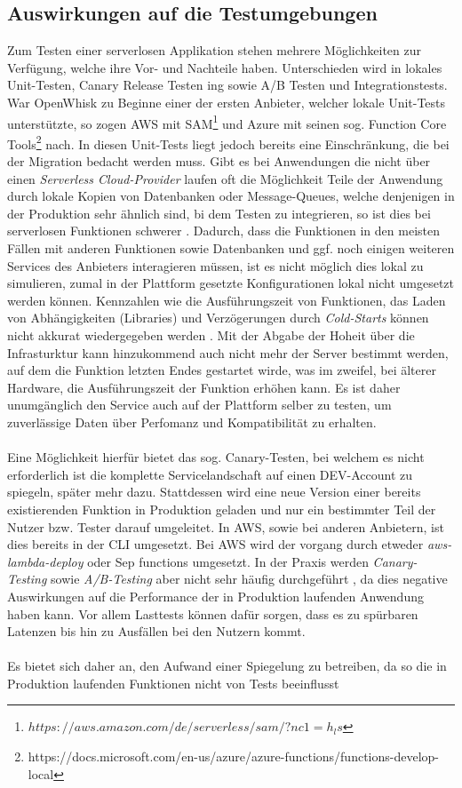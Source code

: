 \subsection{Auswirkungen auf die Testumgebungen}
Zum Testen einer serverlosen Applikation stehen mehrere Möglichkeiten zur Verfügung, welche ihre Vor- und Nachteile haben. Unterschieden wird in lokales Unit-Testen, Canary Release Testen ing sowie A/B Testen und Integrationstests. War OpenWhisk zu Beginne einer der ersten Anbieter, welcher lokale Unit-Tests unterstützte, so zogen AWS mit SAM\footnote{$https://aws.amazon.com/de/serverless/sam/?nc1=h_ls$} und Azure mit seinen sog. Function Core Tools\footnote{https://docs.microsoft.com/en-us/azure/azure-functions/functions-develop-local} nach. In diesen Unit-Tests liegt jedoch bereits eine Einschränkung, die bei der Migration bedacht werden muss. Gibt es bei Anwendungen die nicht über einen \textit{Serverless Cloud-Provider} laufen oft die Möglichkeit Teile der Anwendung durch lokale Kopien von Datenbanken oder Message-Queues, welche denjenigen in der Produktion sehr ähnlich sind, bi dem Testen zu integrieren, so ist dies bei serverlosen Funktionen schwerer \cite{roberts2017serverless}.  Dadurch, dass die Funktionen in den meisten Fällen mit anderen Funktionen sowie Datenbanken und ggf. noch einigen weiteren Services des Anbieters interagieren müssen, ist es nicht möglich dies lokal zu simulieren, zumal in der Plattform gesetzte Konfigurationen lokal nicht umgesetzt werden können. Kennzahlen wie die Ausführungszeit von Funktionen, das Laden von Abhängigkeiten (Libraries) und Verzögerungen durch \textit{Cold-Starts} können nicht akkurat wiedergegeben werden \cite{racicot2019quality}. Mit der Abgabe der Hoheit über die Infrasturktur kann hinzukommend auch nicht mehr der Server bestimmt werden, auf dem die Funktion letzten Endes gestartet wirde, was im zweifel, bei älterer Hardware, die Ausführungszeit der Funktion erhöhen kann. Es ist daher unumgänglich den Service auch auf der Plattform selber zu testen, um zuverlässige Daten über Perfomanz und Kompatibilität zu erhalten.\\\\ Eine Möglichkeit hierfür bietet das sog. Canary-Testen, bei welchem es nicht erforderlich ist die komplette Servicelandschaft auf einen DEV-Account zu spiegeln, später mehr dazu. Stattdessen wird eine neue Version einer bereits existierenden Funktion in Produktion geladen und nur ein bestimmter Teil der Nutzer bzw. Tester darauf umgeleitet. In AWS, sowie bei anderen Anbietern, ist dies bereits in der CLI umgesetzt. Bei AWS wird der vorgang durch etweder \textit{aws-lambda-deploy} oder Sep functions umgesetzt. In der Praxis werden \textit{Canary-Testing} sowie \textit{A/B-Testing} aber nicht sehr häufig durchgeführt \cite{leitner2019mixed}, da dies negative Auswirkungen auf die Performance der in Produktion laufenden Anwendung haben kann. Vor allem Lasttests können dafür sorgen, dass es zu spürbaren Latenzen bis hin zu Ausfällen bei den Nutzern kommt.\\\\ Es bietet sich daher an, den Aufwand einer Spiegelung zu betreiben, da so die in Produktion laufenden Funktionen nicht von Tests beeinflusst 